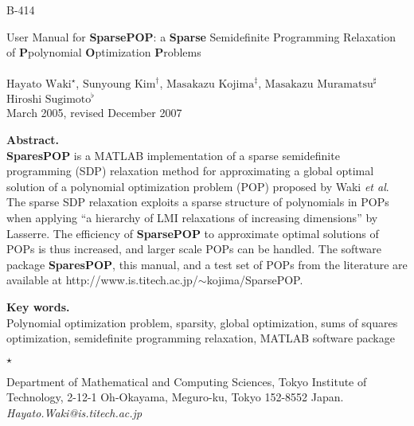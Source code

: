 \thispagestyle{empty}

\noindent
\parbox[t]{1.2cm}{B-414}
\parbox[t]{14cm}
{User Manual for {\bf SparsePOP}:  
      a {\bf Sparse}  Semidefinite   Programming 
	Relaxation of {\bf P}polynomial {\bf O}ptimization {\bf P}roblems \\~\\
$\mbox{Hayato Waki}^{\star}$,
$\mbox{Sunyoung Kim}^{\dagger}$,
$\mbox{Masakazu Kojima}^{\ddagger}$, 
$\mbox{Masakazu Muramatsu}^{\sharp}$ \\
$\mbox{Hiroshi Sugimoto}^{\flat}$ \\
March 2005, revised December 2007
} 

\vspace{1cm}

\noindent
{\bf Abstract.} \\ 
{\bf SparesPOP} is a MATLAB implementation of a sparse semidefinite programming (SDP)
relaxation method  for approximating a global optimal solution of a polynomial optimization problem (POP) 
proposed by Waki {\it et al}.
The sparse SDP relaxation exploits a sparse structure of polynomials in POPs
when applying ``a hierarchy of LMI relaxations of increasing dimensions''  by Lasserre.
The efficiency of {\bf SparsePOP} 
to approximate optimal solutions of POPs 
is thus increased, and  larger scale POPs can be handled. 
The software package {\bf SparesPOP}, this manual, and
a  test set of POPs from the literature are available at
\mbox{http://www.is.titech.ac.jp/$\sim$kojima/SparsePOP}.

\vspace{1cm}
  
\noindent
{\bf Key words. } \vspace{0.1cm} \\
Polynomial optimization problem, sparsity, global optimization,
sums of squares optimization, 
semidefinite programming relaxation, MATLAB software package

\vspace{1cm}


\noindent
\parbox[t]{0.5cm}{$\star$}
\parbox[t]{14.9cm}{Department of Mathematical and Computing Sciences,
                      Tokyo Institute of Technology,
                      2-12-1 Oh-Okayama, Meguro-ku, Tokyo 152-8552 Japan.
{\it Hayato.Waki@is.titech.ac.jp}
}

